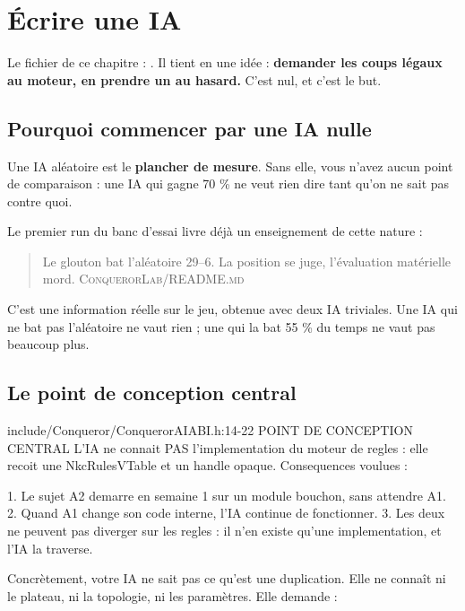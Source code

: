 \chapter{Écrire une IA}

Le fichier de ce chapitre :
. Il tient en une
idée : \textbf{demander les coups légaux au moteur, en prendre un au hasard.}
C'est nul, et c'est le but.

\section{Pourquoi commencer par une IA nulle}

Une IA aléatoire est le \textbf{plancher de mesure}. Sans elle, vous n'avez aucun
point de comparaison : une IA qui gagne 70 \% ne veut rien dire tant qu'on ne sait
pas contre quoi.

Le premier run du banc d'essai livre déjà un enseignement de cette nature :

\begin{quote}\small
Le glouton bat l'aléatoire 29--6. La position se juge, l'évaluation matérielle
mord.
\hfill\textsc{ConquerorLab/README.md}
\end{quote}

C'est une information réelle sur le jeu, obtenue avec deux IA triviales. Une IA
qui ne bat pas l'aléatoire ne vaut rien ; une qui la bat 55 \% du temps ne vaut
pas beaucoup plus.

\section{Le point de conception central}

\begin{nkcode}{include/Conqueror/ConquerorAIABI.h:14-22}
POINT DE CONCEPTION CENTRAL
L'IA ne connait PAS l'implementation du moteur de regles : elle recoit une
NkcRulesVTable et un handle opaque. Consequences voulues :

  1. Le sujet A2 demarre en semaine 1 sur un module bouchon, sans attendre A1.
  2. Quand A1 change son code interne, l'IA continue de fonctionner.
  3. Les deux ne peuvent pas diverger sur les regles : il n'en existe qu'une
     implementation, et l'IA la traverse.
\end{nkcode}

Concrètement, votre IA ne sait pas ce qu'est une duplication. Elle ne connaît ni
le plateau, ni la topologie, ni les paramètres. Elle demande :

